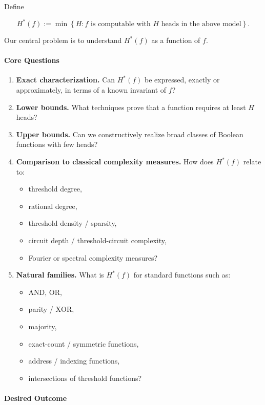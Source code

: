 \documentclass{article}
\theoremstyle{definition}
\theoremstyle{plain}
\begin{document}
\begin{sourcebox}
Define

\[H^{\ast}(f) := \min \left\lbrace H : f \text{ is computable with } H \text{ heads in the above model} \right\rbrace.\]

Our central problem is to understand $H^{\ast}(f)$ as a function of $f$.

\paragraph{Core Questions}

\begin{enumerate}[leftmargin=*,nosep]
  \item \textbf{Exact characterization.} Can $H^{\ast}(f)$ be expressed, exactly or approximately, in terms of a known invariant of $f$?
  \item \textbf{Lower bounds.} What techniques prove that a function requires at least $H$ heads?
  \item \textbf{Upper bounds.} Can we constructively realize broad classes of Boolean functions with few heads?
  \item \textbf{Comparison to classical complexity measures.} How does $H^{\ast}(f)$ relate to:
\begin{itemize}[leftmargin=*,nosep]
  \item threshold degree,
  \item rational degree,
  \item threshold density / sparsity,
  \item circuit depth / threshold-circuit complexity,
  \item Fourier or spectral complexity measures?
\end{itemize}
  \item \textbf{Natural families.} What is $H^{\ast}(f)$ for standard functions such as:
\begin{itemize}[leftmargin=*,nosep]
  \item $\mathrm{AND}$, $\mathrm{OR}$,
  \item parity / $\mathrm{XOR}$,
  \item majority,
  \item exact-count / symmetric functions,
  \item address / indexing functions,
  \item intersections of threshold functions?
\end{itemize}
\end{enumerate}

\paragraph{Desired Outcome}


\end{sourcebox}
\end{document}
